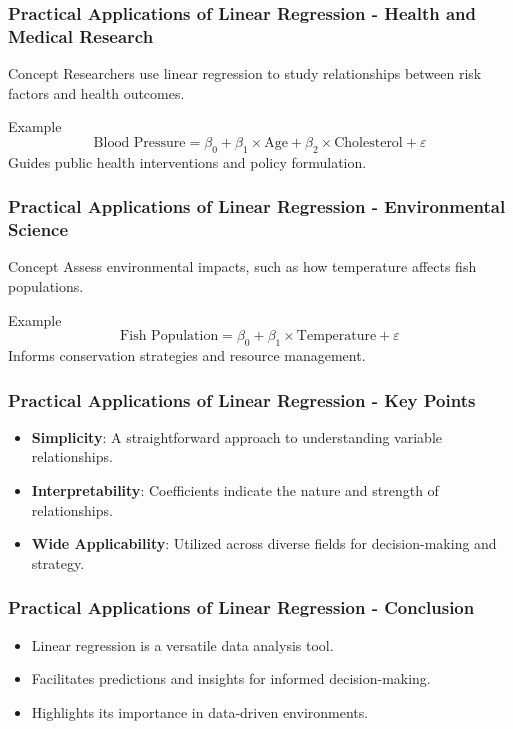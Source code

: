 \documentclass[aspectratio=169]{beamer}
\begin{document}
\begin{frame}[fragile]
    \frametitle{Practical Applications of Linear Regression - Health and Medical Research}
    \begin{block}{Concept}
        Researchers use linear regression to study relationships between risk factors and health outcomes.
    \end{block}
    \begin{block}{Example}
        \[
        \text{Blood Pressure} = \beta_0 + \beta_1 \times \text{Age} + \beta_2 \times \text{Cholesterol} + \varepsilon
        \]
        Guides public health interventions and policy formulation.
    \end{block}
\end{frame}

\begin{frame}[fragile]
    \frametitle{Practical Applications of Linear Regression - Environmental Science}
    \begin{block}{Concept}
        Assess environmental impacts, such as how temperature affects fish populations.
    \end{block}
    \begin{block}{Example}
        \[
        \text{Fish Population} = \beta_0 + \beta_1 \times \text{Temperature} + \varepsilon
        \]
        Informs conservation strategies and resource management.
    \end{block}
\end{frame}

\begin{frame}[fragile]
    \frametitle{Practical Applications of Linear Regression - Key Points}
    \begin{itemize}
        \item \textbf{Simplicity}: A straightforward approach to understanding variable relationships.
        \item \textbf{Interpretability}: Coefficients indicate the nature and strength of relationships.
        \item \textbf{Wide Applicability}: Utilized across diverse fields for decision-making and strategy.
    \end{itemize}
\end{frame}

\begin{frame}[fragile]
    \frametitle{Practical Applications of Linear Regression - Conclusion}
    \begin{itemize}
        \item Linear regression is a versatile data analysis tool.
        \item Facilitates predictions and insights for informed decision-making.
        \item Highlights its importance in data-driven environments.
    \end{itemize}
\end{frame}
\end{document}
